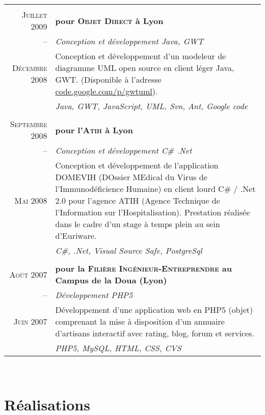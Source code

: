 \documentclass[a4paper,10pt]{article}
\begin{document}
\begin{supertabular}{r|p{11cm}}
   \\
  \textsc{Juillet} 2009 & \textbf{pour \textsc{Objet Direct} à Lyon} \\
  -- & \emph{Conception et développement Java, GWT} \\
  \footnotesize{\textsc{Décembre} 2008}& \footnotesize{Conception et développement d’un modeleur de diagramme UML open source en client léger Java, GWT. (Disponible à l’adresse \href{http://code.google.com/p/gwtuml/}{code.google.com/p/gwtuml}).} \\
  & \emph{Java, GWT, JavaScript, UML, Svn, Ant, Google code} \\


   \\
  \textsc{Septembre} 2008 & \textbf{pour l’\textsc{Atih} à Lyon} \\
  -- & \emph{Conception et développement C\# .Net} \\
  \footnotesize{\textsc{Mai} 2008} & \footnotesize{Conception et développement de l’application DOMEVIH (DOssier MEdical du Virus de l’Immunodéficience Humaine) en client lourd C\# / .Net 2.0 pour l’agence ATIH (Agence Technique de l’Information sur l’Hospitalisation). Prestation réalisée dans le cadre d’un stage à temps plein au sein d’Euriware.} \\
  & \emph{C\#, .Net, Visual Source Safe, PostgreSql} \\


   \\
  \textsc{Août} 2007 & \textbf{pour la \textsc{Filière Ingénieur-Entreprendre} au Campus de la Doua (Lyon)} \\
  -- & \emph{Développement PHP5} \\
  \footnotesize{\textsc{Juin} 2007} & \footnotesize{Développement d’une application web en PHP5 (objet) comprenant la mise à disposition d’un annuaire d’artisans interactif avec rating, blog, forum et services.} \\
  & \emph{PHP5, MySQL, HTML, CSS, CVS} \\

\end{supertabular} \\

\section{Réalisations}
\end{document}
